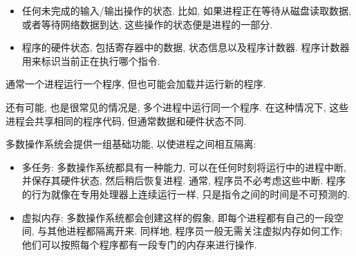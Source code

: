\documentclass[12pt]{book}
\begin{document}
{\begin{itemize}
\item 任何未完成的输入/输出操作的状态. 比如, 
  如果进程正在等待从磁盘读取数据, 或者等待网络数据到达, 
  这些操作的状态便是进程的一部分.

\item 程序的硬件状态, 包括寄存器中的数据, 状态信息以及程序计数器.
  程序计数器用来标识当前正在执行哪个指令.

\end{itemize}
通常一个进程运行一个程序, 但也可能会加载并运行新的程序.


还有可能, 也是很常见的情况是, 
多个进程中运行同一个程序. 在这种情况下, 这些进程会共享相同的程序代码,
但通常数据和硬件状态不同.

多数操作系统会提供一组基础功能, 以使进程之间相互隔离:

\begin{itemize}

\item 多任务: 多数操作系统都具有一种能力,
  可以在任何时刻将运行中的进程中断, 并保存其硬件状态,
  然后稍后恢复进程.
  通常, 程序员不必考虑这些中断.
  程序的行为就像在专用处理器上连续运行一样,
  只是指令之间的时间是不可预测的.


\item 虚拟内存: 多数操作系统都会创建这样的假象, 
  即每个进程都有自己的一段空间, 与其他进程都隔离开来.
  同样地, 程序员一般无需关注虚拟内存如何工作; 
  他们可以按照每个程序都有一段专门的内存来进行操作.



\end{itemize}}
\end{document}
